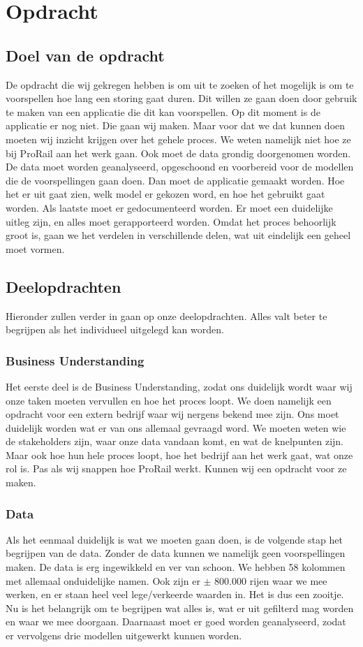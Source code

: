 \documentclass{article}
\begin{document}
\newpage
\section{Opdracht}

\subsection{Doel van de opdracht}
De opdracht die wij gekregen hebben is om uit te zoeken of het mogelijk is om te voorspellen hoe lang een storing gaat duren. Dit willen ze gaan doen door gebruik te maken van een applicatie die dit kan voorspellen. Op dit moment is de applicatie er nog niet. Die gaan wij maken. Maar voor dat we dat kunnen doen moeten wij inzicht krijgen over het gehele proces. We weten namelijk niet hoe ze bij ProRail aan het werk gaan. Ook moet de data grondig doorgenomen worden. De data moet worden geanalyseerd, opgeschoond en voorbereid voor de modellen die de voorspellingen gaan doen. Dan moet de applicatie gemaakt worden. Hoe het er uit gaat zien, welk model er gekozen word, en hoe het gebruikt gaat worden. Als laatste moet er gedocumenteerd worden. Er moet een duidelijke uitleg zijn, en alles moet gerapporteerd worden. Omdat het proces behoorlijk groot is, gaan we het verdelen in verschillende delen, wat uit eindelijk een geheel moet vormen.

\subsection{Deelopdrachten}
Hieronder zullen verder in gaan op onze deelopdrachten. Alles valt beter te begrijpen als het individueel uitgelegd kan worden.

\subsubsection{Business Understanding}
Het eerste deel is de Business Understanding, zodat ons duidelijk wordt waar wij onze taken moeten vervullen en hoe het proces loopt. We doen namelijk een opdracht voor een extern bedrijf waar wij nergens bekend mee zijn. Ons moet duidelijk worden wat er van ons allemaal gevraagd word. We moeten weten wie de stakeholders zijn, waar onze data vandaan komt, en wat de knelpunten zijn. Maar ook hoe hun hele proces loopt, hoe het bedrijf aan het werk gaat, wat onze rol is. Pas als wij snappen hoe ProRail werkt. Kunnen wij een opdracht voor ze maken.

\subsubsection{Data}
Als het eenmaal duidelijk is wat we moeten gaan doen, is de volgende stap het begrijpen van de data. Zonder de data kunnen we namelijk geen voorspellingen maken. De data is erg ingewikkeld en ver van schoon. We hebben 58 kolommen met allemaal onduidelijke namen. Ook zijn er $\pm$ 800.000 rijen waar we mee werken, en er staan heel veel lege/verkeerde waarden in. Het is dus een zooitje. Nu is het belangrijk om te begrijpen wat alles is, wat er uit gefilterd mag worden en waar we mee doorgaan. Daarnaast moet er goed worden geanalyseerd, zodat er vervolgens drie modellen uitgewerkt kunnen worden.
 
\end{document}
